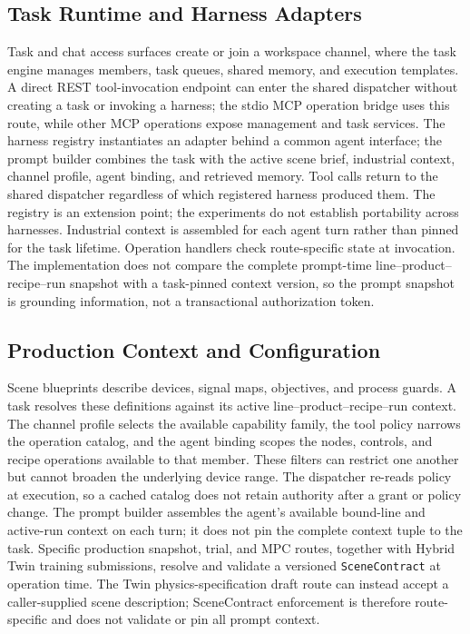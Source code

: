 \subsection{Task Runtime and Harness Adapters}
Task and chat access surfaces create or join a workspace channel, where the
task engine manages members, task queues, shared memory, and execution
templates. A direct REST tool-invocation endpoint can enter the shared
dispatcher without creating a task or invoking a harness; the stdio MCP
operation bridge uses this route, while other MCP operations expose management
and task services.
The harness registry instantiates an adapter behind a common agent interface;
the prompt builder combines the task with the active scene brief, industrial
context, channel profile, agent binding, and retrieved memory. Tool calls
return to the shared dispatcher regardless of which registered harness
produced them. The registry is an extension point; the experiments do not
establish portability across harnesses. Industrial context is assembled for
each agent turn rather than pinned for the task lifetime. Operation handlers
check route-specific state at invocation. The implementation does not compare the complete prompt-time
line--product--recipe--run snapshot with a task-pinned context version, so the
prompt snapshot is grounding information, not a transactional authorization
token.

\subsection{Production Context and Configuration}
Scene blueprints describe devices, signal maps, objectives, and process
guards. A task resolves these definitions against its active
line--product--recipe--run context. The channel profile selects the available
capability family, the tool policy narrows the operation catalog, and the
agent binding scopes the nodes, controls, and recipe operations available to
that member. These filters can restrict one another but cannot broaden the
underlying device range. The dispatcher re-reads policy at execution, so a
cached catalog does not retain authority after a grant or policy change. The
prompt builder assembles the agent's available bound-line and active-run
context on each turn; it does not pin the complete context tuple to the task.
Specific production snapshot, trial, and MPC routes, together with Hybrid Twin
training submissions, resolve and validate a versioned \texttt{SceneContract}
at operation time. The Twin physics-specification draft route can instead
accept a caller-supplied scene description; SceneContract enforcement is
therefore route-specific and does not validate or pin all prompt context.

